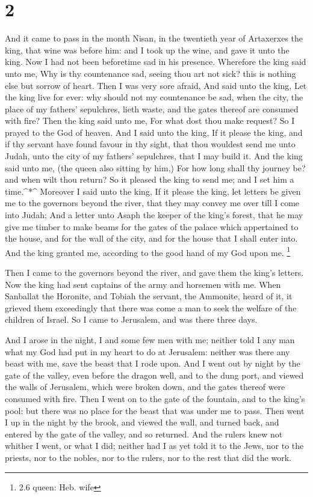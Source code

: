 \hypertarget{section-1}{%
\section{2}\label{section-1}}

 And it came to pass in the month Nisan, in the twentieth
year of Artaxerxes the king, that wine was before him: and I took up the
wine, and gave it unto the king. Now I had not been beforetime sad in
his presence.  Wherefore the king said unto me, Why is thy
countenance sad, seeing thou art not sick? this is nothing else but
sorrow of heart. Then I was very sore afraid,  And said unto
the king, Let the king live for ever: why should not my countenance be
sad, when the city, the place of my fathers' sepulchres, lieth waste,
and the gates thereof are consumed with fire?  Then the king
said unto me, For what dost thou make request? So I prayed to the God of
heaven.  And I said unto the king, If it please the king,
and if thy servant have found favour in thy sight, that thou wouldest
send me unto Judah, unto the city of my fathers' sepulchres, that I may
build it.  And the king said unto me, (the queen also
sitting by him,) For how long shall thy journey be? and when wilt thou
return? So it pleased the king to send me; and I set him a
time.\^{}*\^{}  Moreover I said unto the king, If it please
the king, let letters be given me to the governors beyond the river,
that they may convey me over till I come into Judah;  And a
letter unto Asaph the keeper of the king's forest, that he may give me
timber to make beams for the gates of the palace which appertained to
the house, and for the wall of the city, and for the house that I shall
enter into. And the king granted me, according to the good hand of my
God upon me. \footnote{2.6 queen: Heb. wife}

 Then I came to the governors beyond the river, and gave
them the king's letters. Now the king had sent captains of the army and
horsemen with me.  When Sanballat the Horonite, and Tobiah
the servant, the Ammonite, heard of it, it grieved them exceedingly that
there was come a man to seek the welfare of the children of Israel.
 So I came to Jerusalem, and was there three days.

 And I arose in the night, I and some few men with me;
neither told I any man what my God had put in my heart to do at
Jerusalem: neither was there any beast with me, save the beast that I
rode upon.  And I went out by night by the gate of the
valley, even before the dragon well, and to the dung port, and viewed
the walls of Jerusalem, which were broken down, and the gates thereof
were consumed with fire.  Then I went on to the gate of the
fountain, and to the king's pool: but there was no place for the beast
that was under me to pass.  Then went I up in the night by
the brook, and viewed the wall, and turned back, and entered by the gate
of the valley, and so returned.  And the rulers knew not
whither I went, or what I did; neither had I as yet told it to the Jews,
nor to the priests, nor to the nobles, nor to the rulers, nor to the
rest that did the work.


